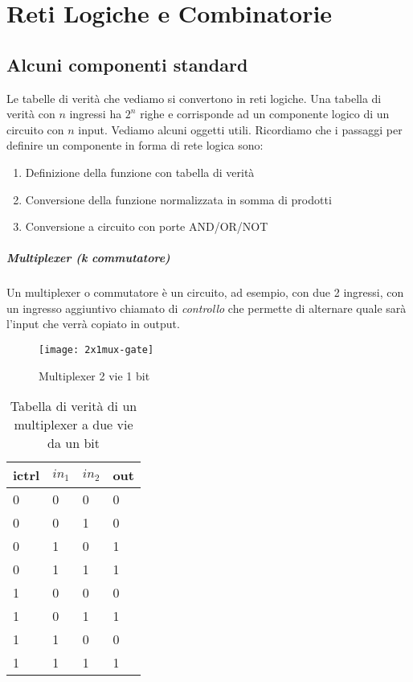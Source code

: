 \chapter{Reti Logiche e Combinatorie} 

\section{Alcuni componenti standard}

Le tabelle di verità che vediamo si convertono in reti logiche. Una tabella di verità con $ n $ ingressi ha $ 2^n $ righe e corrisponde ad un componente logico di un circuito con $ n $ input. Vediamo alcuni oggetti utili. Ricordiamo che i passaggi per definire un componente in forma di rete logica sono: 

\begin{enumerate}
	\item Definizione della funzione con tabella di verità
	\item Conversione della funzione normalizzata in somma di prodotti
	\item Conversione a circuito con porte AND/OR/NOT
\end{enumerate}

\paragraph{Multiplexer (k commutatore)}
Un multiplexer o commutatore è un circuito, ad esempio, con due 2 ingressi, con un ingresso aggiuntivo chiamato di \textit{controllo} che permette di alternare quale sarà l'input che verrà copiato in output.

\begin{figure}
	\centering
	\texttt{[image: 2x1mux-gate]}
	\caption{Multiplexer 2 vie 1 bit}
\end{figure}

\begin{table}[H]
	\centering
	\caption{Tabella di verità di un multiplexer a due vie da un bit}
	\label{tab:multiplexer1}
	\begin{tabular}{|lll|l|}
		\hline
		ictrl & $ in_1 $ & $ in_2 $ & out \\ \hline
		0     & 0   & 0   & 0   \\
		0     & 0   & 1   & 0   \\
		0     & 1   & 0   & 1   \\
		0     & 1   & 1   & 1   \\ \hline
		1     & 0   & 0   & 0   \\
		1     & 0   & 1   & 1   \\
		1     & 1   & 0   & 0   \\
		1     & 1   & 1   & 1   \\ \hline
	\end{tabular}
\end{table}

